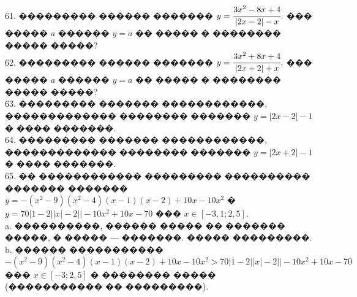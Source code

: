 \documentclass[12pt]{article}
\begin{document}
\\
61. ��������� ������ ������� $y=\cfrac{3x^2-8x+4}{|2x-2|-x}.$ ��� ����� $a$ ������ $y=a$ �� ����� � �������� ����� �����?\\
62. ��������� ������ ������� $y=\cfrac{3x^2+8x+4}{|2x+2|+x}.$ ��� ����� $a$ ������ $y=a$ �� ����� � �������� ����� �����?\\
63. ��������� ������� ������������, ������������� �������� ������� $y=|2x-2|-1$ � ���� �������.\\
64. ��������� ������� ������������, ������������� �������� ������� $y=|2x+2|-1$ � ���� �������.\\
65. �� ������������ ��������� ���������� ������� ������� $y=-(x^2-9)(x^2-4)(x-1)(x-2)+10x-10x^2$ � $y=70|1-2||x|-2||-10x^2+10x-70$ ���
$x\in[-3,1;2,5].$\\
a. ����������, ������ ����� �� ������� �����, � ����� --- �������. ����� ���������.\\
b. ������ �����������  $-(x^2-9)(x^2-4)(x-1)(x-2)+10x-10x^2 >70|1-2||x|-2||-10x^2+10x-70$ ���
$x\in[-3;2,5]$ � �������� ����� (����������� �� ���������).
\begin{center}\end{center}
\end{document}
